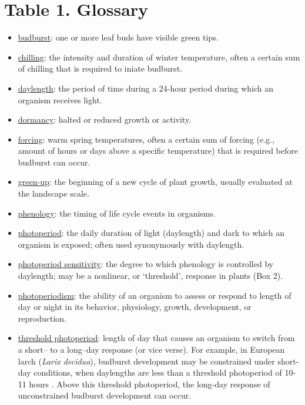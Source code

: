\documentclass{article}
\begin{document}
\section* {Table 1. Glossary}
\begin{itemize}
\item \underline{budburst}: one or more leaf buds have visible green tips. 
\item \underline{chilling}: the intensity and duration of winter temperature, often a certain sum of chilling \citep[e.g., amount of hours or days of cold temperatures, defined by a specific critical temperature or range of temperatures, such as between 0 and 7.2 \degree C,][]{richardson1974} that is required to iniate budburst.
\item \underline{daylength}: the period of time during a 24-hour period during which an organism receives light.
\item \underline{dormancy}: halted or reduced growth or activity.
\item \underline{forcing}: warm spring temperatures, often a certain sum of forcing (e.g., amount of hours or days above a specific temperature) that is required before budburst can occur.
\item \underline{green-up}: the beginning of a new cycle of plant growth, usually evaluated at the landscape scale.
\item \underline{phenology}: the timing of life cycle events in organisms.
\item \underline{photoperiod}: the daily duration of light (daylength) and dark to which an organism is exposed; often used synonymously with daylength.
\item \underline{photoperiod sensitivity}: the degree to which phenology is controlled by daylength; may be a nonlinear, or `threshold', response in plants (Box 2).
\item \underline{photoperiodism}: the ability of an organism to assess or respond to length of day or night in its behavior, physiology, growth, development, or reproduction.
\item \underline{threshold photoperiod}: length of day that causes an organism to switch from a short-- to a long--day response (or vice verse). For example, in European larch (\emph{Larix decidua}), budburst development may be constrained under short-day conditions, when daylengths are less than a threshold photoperiod of 10-11 hours \citep{migliavacca2008}. Above this threshold photoperiod, the long-day response of unconstrained budburst development can occur.
\end{itemize}
\end{document}
